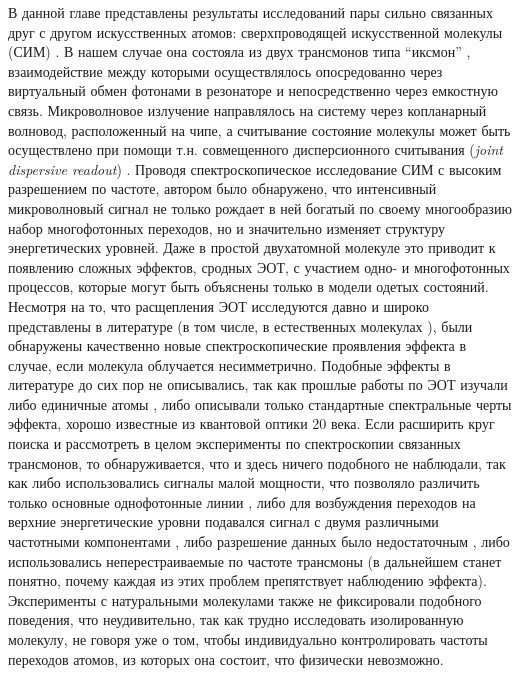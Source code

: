 \documentclass[14pt, a4paper]{extreport}
\numberwithin{equation}{section}
\begin{document}
В данной главе представлены результаты исследований пары сильно связанных друг с другом искусственных атомов: сверхпроводящей искусственной молекулы (СИМ) \cite{kou2017fluxonium}. В нашем случае она состояла из двух трансмонов типа ``иксмон'' \cite{koch2007charge, barends2013coherent}, взаимодействие между которыми осуществлялось опосредованно через виртуальный обмен фотонами в резонаторе \cite{majer2007coupling} и непосредственно через емкостную связь. Микроволновое излучение направлялось на систему через копланарный волновод, расположенный на чипе, а считывание состояние молекулы может быть осуществлено при помощи т.н. совмещенного дисперсионного считывания  (\foreignlanguage{english}{\textit{joint dispersive readout}}) \cite{filipp2009two, chow2010detecting}. Проводя спектроскопическое исследование СИМ с высоким разрешением по частоте, автором было обнаружено, что интенсивный микроволновый сигнал не только рождает в ней богатый по своему многообразию набор многофотонных переходов, но и значительно изменяет структуру энергетических уровней. Даже в простой двухатомной молекуле это приводит к появлению сложных эффектов, сродных ЭОТ, с участием одно- и многофотонных процессов, которые могут быть объяснены только в модели одетых состояний. Несмотря на то, что расщепления ЭОТ исследуются давно и широко представлены в литературе (в том числе, в естественных молекулах \cite{tamarat1995pump, ahmed2012autler}), были обнаружены качественно новые спектроскопические проявления эффекта в случае, если молекула облучается несимметрично. Подобные эффекты в литературе до сих пор не описывались, так как прошлые работы по ЭОТ изучали либо единичные атомы \cite{baur2009measurement, 
sillanpaa2009autler, astafiev2010resonance, 
novikov2013autler, 
koshino2013observation, 
braumuller2015multiphoton, peng2018vacuum, 
gasparinetti2019two}, либо описывали \cite{suri2013observation} только стандартные спектральные черты эффекта, хорошо известные из квантовой оптики 20 века. Если расширить круг поиска и рассмотреть в целом эксперименты по спектроскопии связанных трансмонов, то обнаруживается, что и здесь ничего подобного не наблюдали, так как либо использовались сигналы малой мощности, что позволяло различить только основные однофотонные линии \cite{majer2007coupling, filipp2011multimode}, либо для возбуждения переходов на верхние энергетические уровни подавался сигнал с двумя различными частотными компонентами \cite{dicarlo2009demonstration}, либо разрешение данных было недостаточным \cite{kounalakis2018tuneable}, либо использовались неперестраиваемые по частоте трансмоны \cite{poletto2012entanglement} (в дальнейшем станет понятно, почему каждая из этих проблем препятствует наблюдению эффекта). Эксперименты с натуральными молекулами также не фиксировали подобного поведения, что неудивительно, так как трудно исследовать изолированную молекулу, не говоря уже о том, чтобы индивидуально контролировать частоты переходов атомов, из которых она состоит, что физически невозможно.
\end{document}
